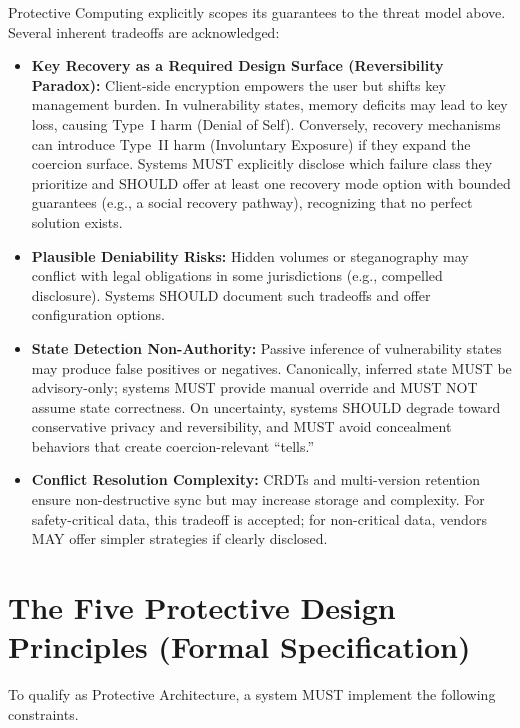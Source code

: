 \documentclass[12pt]{article}
\begin{document}
Protective Computing explicitly scopes its guarantees to the threat model above. Several inherent tradeoffs are acknowledged:

\begin{itemize}
\item \textbf{Key Recovery as a Required Design Surface (Reversibility Paradox):} Client-side encryption empowers the user but shifts key management burden. In vulnerability states, memory deficits may lead to key loss, causing Type~I harm (Denial of Self). Conversely, recovery mechanisms can introduce Type~II harm (Involuntary Exposure) if they expand the coercion surface. Systems MUST explicitly disclose which failure class they prioritize and SHOULD offer at least one recovery mode option with bounded guarantees (e.g., a social recovery pathway), recognizing that no perfect solution exists.
\item \textbf{Plausible Deniability Risks:} Hidden volumes or steganography may conflict with legal obligations in some jurisdictions (e.g., compelled disclosure). Systems SHOULD document such tradeoffs and offer configuration options.
\item \textbf{State Detection Non-Authority:} Passive inference of vulnerability states may produce false positives or negatives. Canonically, inferred state MUST be advisory-only; systems MUST provide manual override and MUST NOT assume state correctness. On uncertainty, systems SHOULD degrade toward conservative privacy and reversibility, and MUST avoid concealment behaviors that create coercion-relevant ``tells.''
\item \textbf{Conflict Resolution Complexity:} CRDTs and multi-version retention ensure non-destructive sync but may increase storage and complexity. For safety-critical data, this tradeoff is accepted; for non-critical data, vendors MAY offer simpler strategies if clearly disclosed.
\end{itemize}

\section{The Five Protective Design Principles (Formal Specification)}

To qualify as Protective Architecture, a system MUST implement the following constraints.
\end{document}
